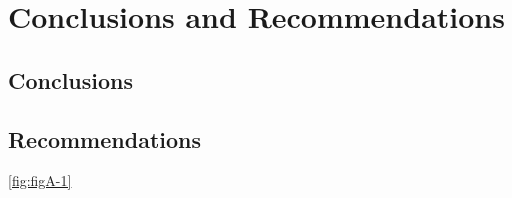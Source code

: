 \chapter{Conclusions and Recommendations}

\section{Conclusions}

\lipsum[1-3]

\section{Recommendations}

\lipsum[1-1] \ref{fig:figA-1}